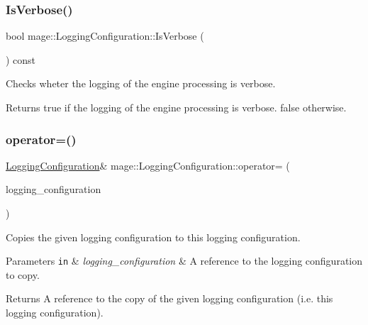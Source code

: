 \subsubsection{\texorpdfstring{Is\+Verbose()}{IsVerbose()}}
{\footnotesize\ttfamily bool mage\+::\+Logging\+Configuration\+::\+Is\+Verbose (\begin{DoxyParamCaption}{ }\end{DoxyParamCaption}) const\hspace{0.3cm}{\ttfamily [noexcept]}}

Checks wheter the logging of the engine processing is verbose.

\begin{DoxyReturn}{Returns}
{\ttfamily true} if the logging of the engine processing is verbose. {\ttfamily false} otherwise. 
\end{DoxyReturn}
\hypertarget{classmage_1_1_logging_configuration_af35d0b0a2f5743944d3d9d66580074db}{}\label{classmage_1_1_logging_configuration_af35d0b0a2f5743944d3d9d66580074db} 
\subsubsection{\texorpdfstring{operator=()}{operator=()}\hspace{0.1cm}{\footnotesize\ttfamily [1/2]}}
{\footnotesize\ttfamily \hyperlink{classmage_1_1_logging_configuration}{Logging\+Configuration}\& mage\+::\+Logging\+Configuration\+::operator= (\begin{DoxyParamCaption}\item[{const \hyperlink{classmage_1_1_logging_configuration}{Logging\+Configuration} \&}]{logging\+\_\+configuration }\end{DoxyParamCaption})\hspace{0.3cm}{\ttfamily [default]}}

Copies the given logging configuration to this logging configuration.


\begin{DoxyParams}[1]{Parameters}
\mbox{\tt in}  & {\em logging\+\_\+configuration} & A reference to the logging configuration to copy. \\
\hline
\end{DoxyParams}
\begin{DoxyReturn}{Returns}
A reference to the copy of the given logging configuration (i.\+e. this logging configuration). 
\end{DoxyReturn}
\hypertarget{classmage_1_1_logging_configuration_a699285ff50d1bb7573cc0c28bcf476b1}{}\label{classmage_1_1_logging_configuration_a699285ff50d1bb7573cc0c28bcf476b1} 
